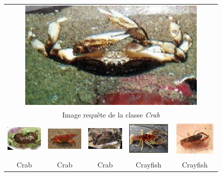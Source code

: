 \begin{figure}[H]
\begin{tabular}{ccccc}\\


\multicolumn{5}{c}{\includegraphics[width=9cm]{Figures/crab/0.jpg}}\\
\multicolumn{5}{c}{Image requête de la classe \textit{Crab}}\\
\includegraphics[width=3cm]{Figures/crab/1.jpg}
&
\includegraphics[width=3cm]{Figures/crab/2.jpg}
&
\includegraphics[width=3cm]{Figures/crab/3.jpg}
&
\includegraphics[width=3cm]{Figures/crab/4.jpg}
&
\includegraphics[width=3cm]{Figures/crab/5.jpg}\\
Crab & Crab & Crab & Crayfish & Crayfish\\



\end{tabular}
\end{figure}
